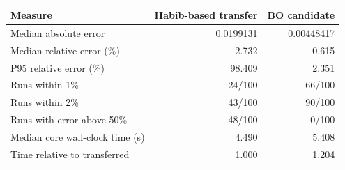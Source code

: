 \begin{table}[htbp]
\centering\small
\caption[Independent confirmation using 100 new paired seeds]{}
\label{tab:b-confirmation}
\begingroup{}
\setlength{\tabcolsep}{3.5pt}
\begin{tabularx}{\linewidth}{@{}Y r r@{}}
\toprule
Measure & Habib-based transfer & BO candidate \\
\midrule
Median absolute error & 0.0199131 & 0.00448417 \\
Median relative error (\%) & 2.732 & 0.615 \\
P95 relative error (\%) & 98.409 & 2.351 \\
Runs within 1\% & 24/100 & 66/100 \\
Runs within 2\% & 43/100 & 90/100 \\
Runs with error above 50\% & 48/100 & 0/100 \\
Median core wall-clock time (s) & 4.490 & 5.408 \\
Time relative to transferred & 1.000 & 1.204 \\
\bottomrule
\end{tabularx}\endgroup
\par\smallskip\footnotesize{}
\end{table}
